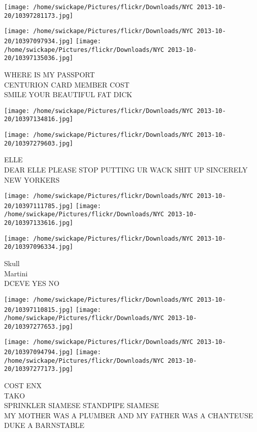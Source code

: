 \documentclass[10pt,letterpaper]{article}
\begin{document}
\texttt{[image: /home/swickape/Pictures/flickr/Downloads/NYC 2013-10-20/10397281173.jpg]}

\vspace{0.25in}
\texttt{[image: /home/swickape/Pictures/flickr/Downloads/NYC 2013-10-20/10397097934.jpg]}
\texttt{[image: /home/swickape/Pictures/flickr/Downloads/NYC 2013-10-20/10397135036.jpg]}

WHERE IS MY PASSPORT\\
CENTURION CARD MEMBER COST\\
SMILE YOUR BEAUTIFUL FAT DICK\\
\pagebreak

\texttt{[image: /home/swickape/Pictures/flickr/Downloads/NYC 2013-10-20/10397134816.jpg]}

\vspace{0.25in}
\texttt{[image: /home/swickape/Pictures/flickr/Downloads/NYC 2013-10-20/10397279603.jpg]}

ELLE\\
DEAR ELLE PLEASE STOP PUTTING UR WACK SHIT UP SINCERELY NEW YORKERS\\
\pagebreak

\texttt{[image: /home/swickape/Pictures/flickr/Downloads/NYC 2013-10-20/10397111785.jpg]}
\texttt{[image: /home/swickape/Pictures/flickr/Downloads/NYC 2013-10-20/10397133616.jpg]}

\vspace{0.25in}
\texttt{[image: /home/swickape/Pictures/flickr/Downloads/NYC 2013-10-20/10397096334.jpg]}

Skull\\
Martini\\
DCEVE YES NO\\
\pagebreak

\texttt{[image: /home/swickape/Pictures/flickr/Downloads/NYC 2013-10-20/10397110815.jpg]}
\texttt{[image: /home/swickape/Pictures/flickr/Downloads/NYC 2013-10-20/10397277653.jpg]}

\texttt{[image: /home/swickape/Pictures/flickr/Downloads/NYC 2013-10-20/10397094794.jpg]}
\texttt{[image: /home/swickape/Pictures/flickr/Downloads/NYC 2013-10-20/10397277173.jpg]}

COST ENX\\
TAKO\\
SPRINKLER SIAMESE STANDPIPE SIAMESE\\
MY MOTHER WAS A PLUMBER AND MY FATHER WAS A CHANTEUSE DUKE A BARNSTABLE\\
\pagebreak
\end{document}
